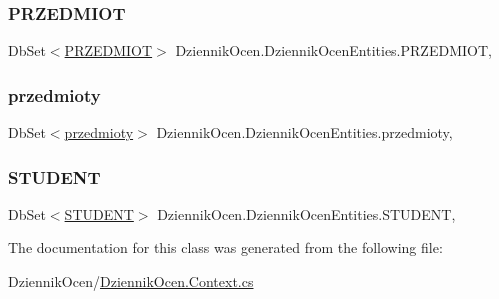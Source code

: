 \subsubsection{\texorpdfstring{P\+R\+Z\+E\+D\+M\+I\+OT}{PRZEDMIOT}}
{\footnotesize\ttfamily Db\+Set$<$\hyperlink{class_dziennik_ocen_1_1_p_r_z_e_d_m_i_o_t}{P\+R\+Z\+E\+D\+M\+I\+OT}$>$ Dziennik\+Ocen.\+Dziennik\+Ocen\+Entities.\+P\+R\+Z\+E\+D\+M\+I\+OT\hspace{0.3cm}{\ttfamily [get]}, {\ttfamily [set]}}

\mbox{\label{class_dziennik_ocen_1_1_dziennik_ocen_entities_ae76bc2bdeec6f76972792082e1656298}} 
\subsubsection{\texorpdfstring{przedmioty}{przedmioty}}
{\footnotesize\ttfamily Db\+Set$<$\hyperlink{class_dziennik_ocen_1_1przedmioty}{przedmioty}$>$ Dziennik\+Ocen.\+Dziennik\+Ocen\+Entities.\+przedmioty\hspace{0.3cm}{\ttfamily [get]}, {\ttfamily [set]}}

\mbox{\label{class_dziennik_ocen_1_1_dziennik_ocen_entities_a6551b0ae65432cd0d3db51f56fbeb36f}} 
\subsubsection{\texorpdfstring{S\+T\+U\+D\+E\+NT}{STUDENT}}
{\footnotesize\ttfamily Db\+Set$<$\hyperlink{class_dziennik_ocen_1_1_s_t_u_d_e_n_t}{S\+T\+U\+D\+E\+NT}$>$ Dziennik\+Ocen.\+Dziennik\+Ocen\+Entities.\+S\+T\+U\+D\+E\+NT\hspace{0.3cm}{\ttfamily [get]}, {\ttfamily [set]}}



The documentation for this class was generated from the following file\+:\begin{DoxyCompactItemize}
\item 
Dziennik\+Ocen/\hyperlink{_dziennik_ocen_8_context_8cs}{Dziennik\+Ocen.\+Context.\+cs}\end{DoxyCompactItemize}
